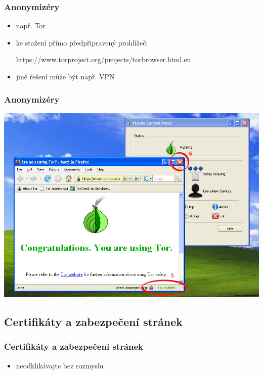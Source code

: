 \documentclass[xetex]{beamer}
\begin{document}
\begin{frame}
	\frametitle{Anonymizéry} 
	\begin{itemize} 
		\item např. Tor
		\item ke stažení přímo předpřipravený prohlížeč:\\
\begin{scriptsize}https://www.torproject.org/projects/torbrowser.html.en\end{scriptsize}
		\item jiné řešení může být např. VPN
	\end{itemize} 
\end{frame}

\begin{frame}
	\frametitle{Anonymizéry} 
	\includegraphics[scale=0.4]{pic/tor-xp.png}
\end{frame}

\subsection{Certifikáty a zabezpečení stránek}

\begin{frame}
	\frametitle{Certifikáty a zabezpečení stránek} 
	\begin{itemize} 
   		\item neodklikávajte bez rozmyslu
	\end{itemize} 
\end{frame}
\end{document}
